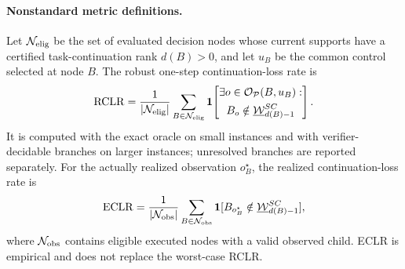 \documentclass[letterpaper]{article} %
\begin{document}
\paragraph{Nonstandard metric definitions.}
Let $\mathcal N_{\rm elig}$ be the set of evaluated decision nodes whose current supports have a certified task-continuation rank $d(B)>0$, and let $u_B$ be the common control selected at node $B$. The robust one-step continuation-loss rate is
\begin{equation}
\mathrm{RCLR}=
\frac{1}{|\mathcal N_{\rm elig}|}
\sum_{B\in\mathcal N_{\rm elig}}
\mathbf 1\!\left[
\begin{gathered}
\exists o\in\mathcal O_{\mathcal P}(B,u_B):\\
B_o\notin\underline{\mathcal W}_{d(B)-1}^{SC}
\end{gathered}
\right].
\label{eq:rclr}
\end{equation}
It is computed with the exact oracle on small instances and with verifier-decidable branches on larger instances; unresolved branches are reported separately. For the actually realized observation $o_B^\star$, the realized continuation-loss rate is
\begin{equation}
\mathrm{ECLR}=
\frac{1}{|\mathcal N_{\rm obs}|}
\sum_{B\in\mathcal N_{\rm obs}}
\mathbf 1[B_{o_B^\star}\notin
\underline{\mathcal W}_{d(B)-1}^{SC}],
\label{eq:eclr}
\end{equation}
where $\mathcal N_{\rm obs}$ contains eligible executed nodes with a valid observed child. ECLR is empirical and does not replace the worst-case RCLR.
\end{document}
